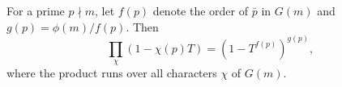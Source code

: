 For a prime $p \nmid m$, let $f(p)$ denote the order of $\bar{p}$ in $G(m)$ and $g(p) = \phi(m)/f(p)$. Then
$$
\prod_\chi (1 - \chi(p)T) = (1 - T^{f(p)})^{g(p)},
$$
where the product runs over all characters $\chi$ of $G(m)$.
